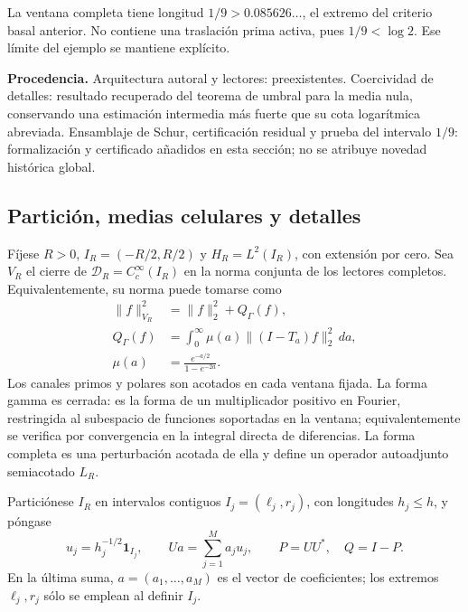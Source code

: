 La ventana completa tiene longitud \(1/9>0.085626\ldots\), el extremo
del criterio basal anterior. No contiene una traslación prima activa,
pues \(1/9<\log2\). Ese límite del ejemplo se mantiene explícito.

\textbf{Procedencia.} Arquitectura autoral y lectores: preexistentes. Coercividad
de detalles: resultado recuperado del teorema de umbral para la media nula, conservando una estimación
intermedia más fuerte que su cota logarítmica abreviada. Ensamblaje de Schur,
certificación residual y prueba del intervalo \(1/9\): formalización y
certificado añadidos en esta sección; no se atribuye novedad histórica global.

\subsection{Partición, medias celulares y detalles}
\label{viii:schur-add-sub-46}

Fíjese \(R>0\), \(I_R=(-R/2,R/2)\) y \(H_R=L^2(I_R)\), con extensión
por cero. Sea \(V_R\) el cierre de \(\mathcal D_R=C_c^\infty(I_R)\) en la
norma conjunta de los lectores completos. Equivalentemente, su norma puede tomarse como
\begin{equation}
\begin{aligned}
\|f\|_{V_R}^2&=\|f\|_2^2+Q_\Gamma(f),\\
Q_\Gamma(f)&=\int_0^\infty\mu(a)\|(I-T_a)f\|_2^2\,da,\\
\mu(a)&=\frac{e^{-a/2}}{1-e^{-2a}}.
\end{aligned}
\label{viii:schur-add-display-2}
\end{equation}
Los canales primos y polares son acotados en cada ventana fijada.
La forma gamma es cerrada: es la forma de un multiplicador positivo
en Fourier, restringida al subespacio de funciones soportadas en la
ventana; equivalentemente se verifica por convergencia en la integral
directa de diferencias. La forma completa es una perturbación acotada
de ella y define un operador autoadjunto semiacotado \(L_R\).

Particiónese \(I_R\) en intervalos contiguos \(I_j=(\ell_j,r_j)\), con
longitudes \(h_j\leq h\), y póngase
\begin{equation}
u_j=h_j^{-1/2}\mathbf1_{I_j},\qquad
Ua=\sum_{j=1}^M a_j u_j,\qquad P=UU^*,\quad Q=I-P.
\label{viii:schur-add-display-3}
\end{equation}
En la última suma, \(a=(a_1,\ldots,a_M)\) es el vector de coeficientes;
los extremos \(\ell_j,r_j\) sólo se emplean al definir \(I_j\).

